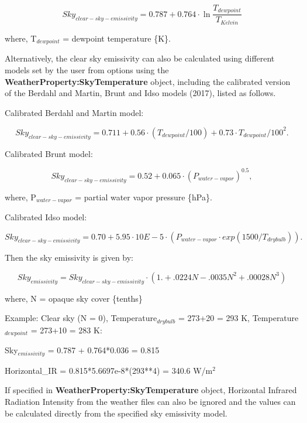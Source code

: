 \begin{equation}
Sky_{clear-sky-emissivity} = 0.787 + 0.764\cdot \ln \frac {T_{dewpoint}}{T_{Kelvin}}
\end{equation}

where, T\(_{dewpoint}\) = dewpoint temperature \{K\}.

Alternatively, the clear sky emissivity can also be calculated using different models set by the user from options using the \textbf{WeatherProperty:SkyTemperature} object, including the calibrated version of the Berdahl and Martin, Brunt and Idso models (2017), listed as follows.

Calibrated Berdahl and Martin model:

\begin{equation}
Sky_{clear-sky-emissivity} = 0.711 + 0.56\cdot(T_{dewpoint} / 100) + 0.73\cdot{T_{dewpoint} / 100}^2.
\end{equation}

Calibrated Brunt model:

\begin{equation}
Sky_{clear-sky-emissivity} = 0.52 + 0.065\cdot(P_{water-vapor})^{0.5},
\end{equation}

where, P\(_{water-vapor}\) = partial water vapor pressure \{hPa\}.

Calibrated Idso model:

\begin{equation}
Sky_{clear-sky-emissivity} = 0.70 + 5.95\cdot10E-5\cdot(P_{water-vapor} \cdot exp(1500/T_{drybulb})).
\end{equation}


Then the sky emissivity is given by:

\begin{equation}
Sky_{emissivity} = Sky_{clear-sky-emissivity} \cdot \left( {1. + .0224N - .0035{N^2} + .00028{N^3}} \right)
\end{equation}

where, N = opaque sky cover \{tenths\}

Example: Clear sky (N = 0), Temperature\(_{drybulb}\) = 273+20 = 293 K, Temperature\(_{dewpoint}\) = 273+10 = 283 K:

Sky\(_{emissivity}\) = 0.787 + 0.764*0.036 = 0.815

Horizontal\_IR = 0.815*5.6697e-8*(293**4) = 340.6 W/m\(^{2}\)

If specified in \textbf{WeatherProperty:SkyTemperature} object, Horizontal Infrared Radiation Intensity from the weather files can also be ignored and the values can be calculated directly from the specified sky emissivity model.

